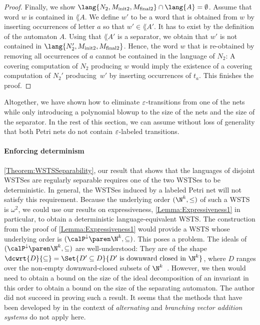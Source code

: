 \documentclass[../../diss.tex]{subfiles}
\begin{document}
\begin{proof}
    Finally, we show $\lang{N_2,M_{\init2},M_{\final2}} \cap \lang{A} = \emptyset$.
    Assume that word $w$ is contained in $\lang{A}$.
    We define $w'$ to be a word that is obtained from $w$ by inserting occurrences of letter $a$ so that $w' \in \lang{A'}$.
    It has to exist by the definition of the automaton $A$.
    Using that $\lang{A'}$ is a separator, we obtain that $w'$ is not contained in $\lang{N_2',M_{\init2},M_{\final2}}$.
    Hence, the word $w$ that is re-obtained by removing all occurrences of $a$ cannot be contained in the language of $N_2$:
    A covering computation of $N_2$ producing $w$ would imply the existence of a covering computation of $N_2'$ producing~$w'$ by inserting occurrences of $t_a$.
    This finishes the proof.
\end{proof}

Altogether, we have shown how to eliminate $\varepsilon$-transitions from one of the nets while only introducing a polynomial blowup to the size of the nets and the size of the separator.
In the rest of this section, we can assume without loss of generality that both Petri nets do not contain $\varepsilon$-labeled transitions.

\paragraph{Enforcing determinism}

\cref{Theorem:WSTSSeparability}, our result that shows that the languages of disjoint WSTSes are regularly separable requires one of the two WSTSes to be deterministic.
In general, the WSTSes induced by a labeled Petri net will not satisfy this requirement.
Because the underlying order $(\N^k,\leq)$ of such a WSTS is $\omega^2$, we could use our results on expressiveness, \cref{Lemma:Expressiveness1} in particular, to obtain a deterministic language-equivalent WSTS.\@
The construction from the proof of \cref{Lemma:Expressiveness1} would provide a WSTS whose underlying order is $(\pwrsetdown{\N^k},\subseteq)$.
This poses a problem.
The ideals of $(\pwrsetdown{\N^k},\subseteq)$ are well-understood: They are of the shape $\dcwrt{D}{\subseteq} = \Set{ D' \subseteq D }{ D' \text{ is downward closed in }  \N^k}$, where $D$ ranges over the non-empty downward-closed subsets of $\N^k$~\cite{LazicS15}.
However, we then would need to obtain a bound on the size of the ideal decomposition of an invariant in this order to obtain a bound on the size of the separating automaton.
The author did not succeed in proving such a result.
It seems that the methods that have been developed by  in the context of \emph{alternating} and \emph{branching vector addition systems} do not apply here.
\end{document}
